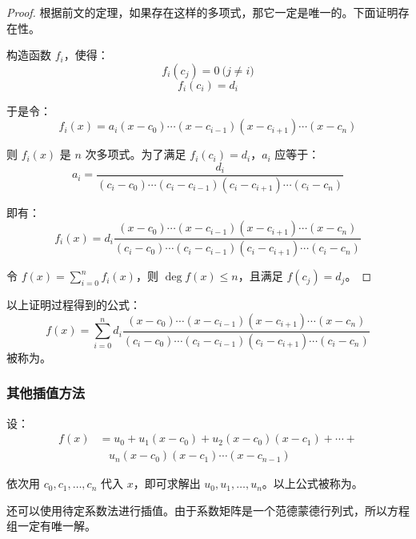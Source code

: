 \begin{proof}
	根据前文的定理，如果存在这样的多项式，那它一定是唯一的。下面证明存在性。

	构造函数 $f_i$，使得：
	$$
	f_i(c_j) = 0 \pod{j \ne i}
	$$$$
	f_i(c_i) = d_i
	$$

	于是令：
	$$
	f_i(x) = a_i (x - c_0) \cdots (x - c_{i - 1}) (x - c_{i + 1}) \cdots (x - c_n)
	$$

	则 $f_i(x)$ 是 $n$ 次多项式。为了满足 $f_i(c_i) = d_i$，$a_i$ 应等于：
	$$
	a_i = \dfrac{d_i}{(c_i - c_0) \cdots (c_i - c_{i - 1}) (c_i - c_{i + 1}) \cdots (c_i - c_n)}
	$$

	即有：
	$$
	f_i(x) = d_i \dfrac{(x - c_0) \cdots (x - c_{i - 1}) (x - c_{i + 1}) \cdots (x - c_n)}{(c_i - c_0) \cdots (c_i - c_{i - 1}) (c_i - c_{i + 1}) \cdots (c_i - c_n)}
	$$

	令 $f(x) = \sum\limits_{i = 0}^n f_i(x)$，则 $\deg f(x) \le n$，且满足 $f(c_j) = d_j$。
\end{proof}

以上证明过程得到的公式：
$$
f(x) = \sum\limits_{i = 0}^n d_i \dfrac{(x - c_0) \cdots (x - c_{i - 1}) (x - c_{i + 1}) \cdots (x - c_n)}{(c_i - c_0) \cdots (c_i - c_{i - 1}) (c_i - c_{i + 1}) \cdots (c_i - c_n)}
$$
被称为\emph{}。

\subsubsection{其他插值方法}

设：
$$
\begin{aligned}
	f(x) &= u_0 + u_1 (x - c_0) + u_2 (x - c_0) (x - c_1) + \cdots +
	\\&~~~~
	u_n (x - c_0) (x - c_1) \cdots (x - c_{n - 1})
\end{aligned}
$$

依次用 $c_0, c_1, \ldots, c_n$ 代入 $x$，即可求解出 $u_0, u_1, \ldots, u_n$。以上公式被称为\emph{}。

\bigskip

还可以使用待定系数法进行插值。由于系数矩阵是一个范德蒙德行列式，所以方程组一定有唯一解。

